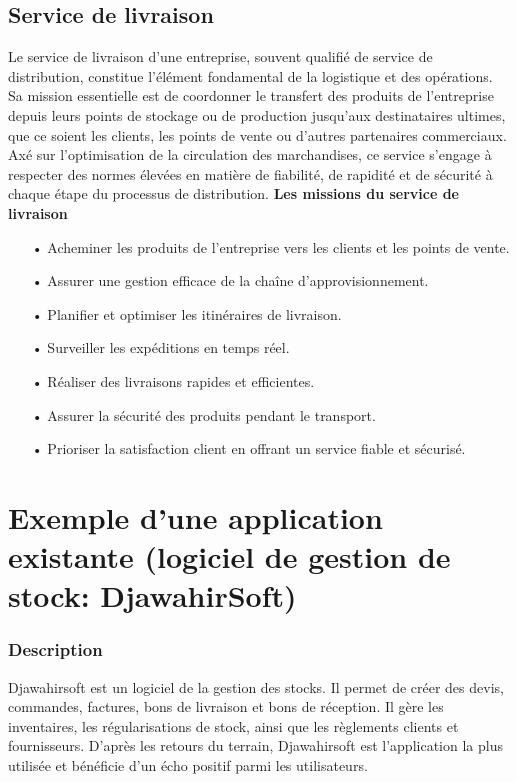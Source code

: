 \documentclass[edit,12pt,a4paper,ChapStyle,oneside,doubleinterligne]{report}
\begin{document}
\subsection{Service de livraison}
Le service de livraison d'une entreprise, souvent qualifié de service de distribution, constitue l'élément fondamental de la logistique et des opérations. Sa mission essentielle est de coordonner le transfert des produits de l'entreprise depuis leurs points de stockage ou de production jusqu'aux destinataires ultimes, que ce soient les clients, les points de vente ou d'autres partenaires commerciaux. Axé sur l'optimisation de la circulation des marchandises, ce service s'engage à respecter des normes élevées en matière de fiabilité, de rapidité et de sécurité à chaque étape du processus de distribution\cite{logistique}.
\newline\newline\textbf{Les missions du service de livraison}\newline
\begin{itemize}
    \item [•] Acheminer les produits de l'entreprise vers les clients et les points de vente.
    \item [•] Assurer une gestion efficace de la chaîne d'approvisionnement. 
    \item [•] Planifier et optimiser les itinéraires de livraison. 
    \item [•] Surveiller les expéditions en temps réel. 
    \item [•] Réaliser des livraisons rapides et efficientes. 
    \item [•] Assurer la sécurité des produits pendant le transport. 
    \item [•] Prioriser la satisfaction client en offrant un service fiable et sécurisé.
\end{itemize}




\section{Exemple d'une application existante (logiciel de gestion de stock: DjawahirSoft)}
\subsubsection{Description}
Djawahirsoft est un logiciel de la gestion des stocks. Il permet de créer des devis, commandes, factures, bons de livraison et bons de réception. Il gère les inventaires, les régularisations de stock, ainsi que les règlements clients et fournisseurs. D'après les retours du terrain, Djawahirsoft est l'application la plus utilisée et bénéficie d'un écho positif parmi les utilisateurs\cite{Djawahirsoft}.
\end{document}
